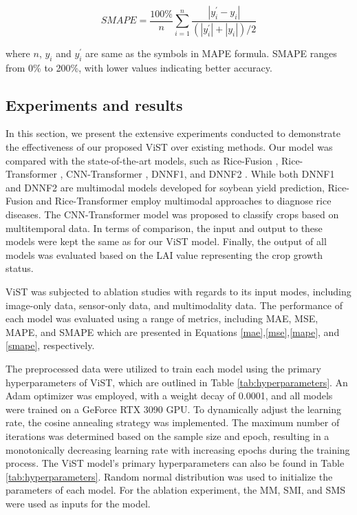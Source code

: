 \documentclass[acmsmall,manuscript, screen, review]{acmart}
\begin{document}
\begin{equation}
  SMAPE=\frac{100\%}{n}\sum_{i=1}^{n}\frac{\left|y_i^\prime-y_i\right|}{\left(\left|y_i^\prime\right|+\left|y_i\right|\right)/2} \label{smape}
\end{equation}

where \begin{math}
  n
\end{math}, \begin{math}
  y_i
\end{math} and \begin{math}
  y_i^\prime
\end{math} are same as the symbols in MAPE formula. SMAPE ranges from 0\% to 200\%, with lower values indicating better accuracy.


\subsection{Experiments and results}

In this section, we present the extensive experiments conducted to demonstrate the effectiveness of our proposed ViST over existing methods. Our model was compared with the state-of-the-art models, such as Rice-Fusion \cite{9672157}, Rice-Transformer \cite{9864182}, CNN-Transformer \cite{8999620}, DNNF1, and DNNF2 \cite{maimaitijiang_soybean_2020}. While both DNNF1 and DNNF2 are multimodal models developed for soybean yield prediction, Rice-Fusion and Rice-Transformer employ multimodal approaches to diagnose rice diseases. The CNN-Transformer model was proposed to classify crops based on multitemporal data. In terms of comparison, the input and output to these models were kept the same as for our ViST model. Finally, the output of all models was evaluated based on the LAI value representing the crop growth status.

ViST was subjected to ablation studies with regards to its input modes, including image-only data, sensor-only data, and multimodality data. The performance of each model was evaluated using a range of metrics, including MAE, MSE, MAPE, and SMAPE which are presented in Equations \ref{mae},\ref{mse},\ref{mape}, and \ref{smape}, respectively.

The preprocessed data were utilized to train each model using the primary hyperparameters of ViST, which are outlined in Table \ref{tab:hyperparameters}. An Adam optimizer was employed, with a weight decay of 0.0001, and all models were trained on a GeForce RTX 3090 GPU. To dynamically adjust the learning rate, the cosine annealing strategy was implemented. The maximum number of iterations was determined based on the sample size and epoch, resulting in a monotonically decreasing learning rate with increasing epochs during the training process. The ViST model's primary hyperparameters can also be found in Table \ref{tab:hyperparameters}. Random normal distribution was used to initialize the parameters of each model. For the ablation experiment, the MM, SMI, and SMS were used as inputs for the model.
\end{document}
